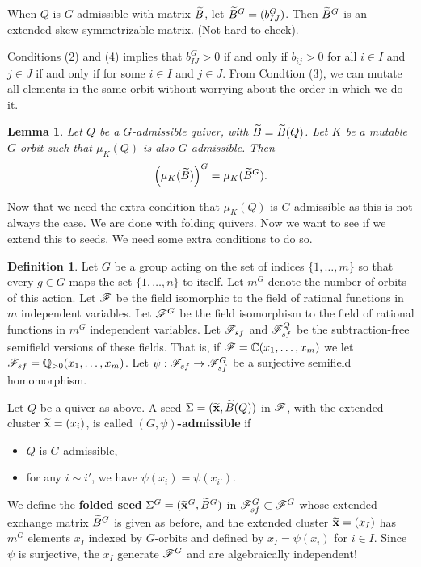 \documentclass[]{pcmi}
\theoremstyle{plain}
\newtheorem{Lemma}[equation]{Lemma}
\theoremstyle{definition}
\newtheorem{Definition}[equation]{Definition}
\begin{document}
When $Q$ is $G$-admissible with matrix $\widetilde{B}$, let $\widetilde{B}^G = (b_{IJ}^G)$. Then $\widetilde{B}^G$ is an extended skew-symmetrizable matrix. (Not hard to check). 

Conditions (2) and (4) implies that $b_{IJ}^G > 0$ if and only if $b_{ij} > 0$ for all $i \in I$ and $j \in J$ if and only if for some $i \in I$ and $j \in J$. From Condtion (3), we can mutate all elements in the same orbit without worrying about the order in which we do it. 

\begin{Lemma}
    Let $Q$ be a $G$-admissible quiver, with $\widetilde{B} = \widetilde{B}(Q)$. Let $K$ be a mutable $G$-orbit such that $\mu_K(Q)$ is also $G$-admissible. Then 
    \[
        \left( \mu_K (\widetilde{B}) \right)^G = {\mu_K(\widetilde{B}^G)}. 
    \]
\end{Lemma}

Now that we need the extra condition that $\mu_K(Q)$ is $G$-admissible as this is not always the case. We are done with folding quivers. Now we want to see if we extend this to seeds. We need some extra conditions to do so. 

\begin{Definition}
    Let $G$ be a group acting on the set of indices $\{1, \ldots, m\}$ so that every $g \in G$ maps the set $\{1, \ldots, n\}$ to itself. Let $m^G$ denote the number of orbits of this action. Let $\mathscr{F}$ be the field isomorphic to the field of rational functions in $m$ independent variables. Let $\mathscr{F}^G$ be the field isomorphism to the field of rational functions in $m^G$ independent variables. Let $\mathscr{F}_{sf}$ and $\mathscr{F}_{sf}^Q$ be the subtraction-free semifield versions of these fields. That is, if $\mathscr{F} = \mathbb{C}(x_1, \ldots, x_m)$ we let $\mathscr{F}_{sf} = \mathbb{Q}_{> 0}(x_1, \ldots, x_m)$. Let $\psi: \mathscr{F}_{sf} \to \mathscr{F}_{sf}^G$ be a surjective semifield homomorphism. 

    Let $Q$ be a quiver as above. A seed $\Sigma = (\widetilde{\mathbf{x}}, \widetilde{B}(Q))$ in $\mathscr{F}$, with the extended cluster $\widetilde{\mathbf{x}} = (x_i)$, is called \textbf{$(G, \psi)$-admissible} if 
    \begin{itemize}
        \item $Q$ is $G$-admissible, 
        \item for any $i \sim i'$, we have $\psi(x_i) = \psi(x_{i'})$. 
    \end{itemize} 
    We define the \textbf{folded seed} $\Sigma^G = (\widetilde{\mathbf{x}}^G, \widetilde{B}^G)$ in $\mathscr{F}_{sf}^G \subset \mathscr{F}^G$ whose extended exchange matrix $\widetilde{B}^G$ is given as before, and the extended cluster $\widetilde{\mathbf{x}} = (x_I)$ has $m^G$ elements $x_I$ indexed by $G$-orbits and defined by $x_I = \psi(x_i)$ for $i \in I$. Since $\psi$ is surjective, the $x_I$ generate $\mathscr{F}^G$ and are algebraically independent!
\end{Definition}
\end{document}
